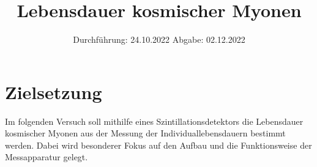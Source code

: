 

\usepackage[nolist,nohyperlinks]{acronym}

\usepackage{longtable}


\subject{V01}
\title{Lebensdauer kosmischer Myonen}
\date{
    Durchführung: 24.10.2022
     \hspace{3em}
    Abgabe: 02.12.2022
}


\maketitle
{}

\section{Zielsetzung}

    Im folgenden Versuch soll mithilfe eines Szintillationsdetektors die Lebensdauer kosmischer Myonen aus der Messung der Individuallebensdauern bestimmt werden.
    Dabei wird besonderer Fokus auf den Aufbau und die Funktionsweise der Messapparatur gelegt.


\clearpage


\clearpage


\clearpage


\clearpage

\printbibliography
\clearpage

\appendix



